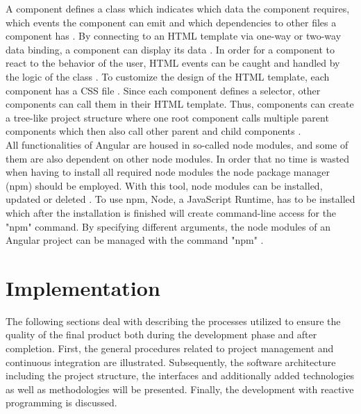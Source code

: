 \documentclass[Bachelor,BIF,english]{twbook}
\begin{document}
A component defines a class which indicates which data the component requires, which events the component can emit and which dependencies to other files a component has \cite[p.~89]{RxAngular5Prj}. By connecting to an HTML template via one-way or two-way data binding, a component can display its data \cite[p.~100,~108]{RxAngular5Prj}. In order for a component to react to the behavior of the user, HTML events can be caught and handled by the logic of the class \cite[p.~111]{RxAngular5Prj}. To customize the design of the HTML template, each component has a CSS file \cite[p.~89]{RxAngular5Prj}. Since each component defines a selector, other components can call them in their HTML template. Thus, components can create a tree-like project structure where one root component calls multiple parent components which then also call other parent and child components \cite[p.~89,~115]{RxAngular5Prj}.
\\[\baselineskip]
All functionalities of Angular are housed in so-called node modules, and some of them are also dependent on other node modules. In order that no time is wasted when having to install all required node modules the node package manager (npm) \cite{Npm} should be employed. With this tool, node modules can be installed, updated or deleted \cite[p.~71]{RxAngular5Prj}. To use npm, Node, a JavaScript Runtime, has to be installed which after the installation is finished will create command-line access for the "npm" command. By specifying different arguments, the node modules of an Angular project can be managed with the command "npm" \cite[p.~69,~71]{RxAngular5Prj}.

\clearpage 

\chapter{Implementation}
The following sections deal with describing the processes utilized to ensure the quality of the final product both during the development phase and after completion. First, the general procedures related to project management and continuous integration are illustrated. Subsequently, the software architecture including the project structure, the interfaces and additionally added technologies as well as methodologies will be presented. Finally, the development with reactive programming is discussed.
\end{document}
